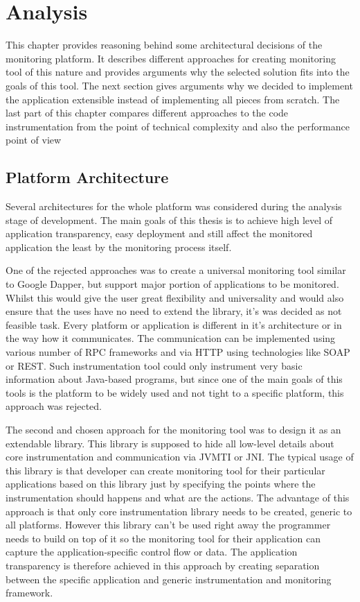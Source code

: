 \chapter{Analysis}
This chapter provides reasoning behind some architectural decisions of the monitoring platform. It describes different approaches for creating monitoring tool of this nature and provides arguments why the selected solution fits into the goals of this tool. The next section gives arguments why we decided to implement the application extensible instead of implementing all pieces from scratch. The last part of this chapter compares different approaches to the code instrumentation from the point of technical complexity and also the performance point of view

\section{Platform Architecture}
Several architectures for the whole platform was considered during the analysis stage of development. The main goals of this thesis is to achieve high level of application transparency, easy deployment and still affect the monitored application the least by the monitoring process itself.

One of the rejected approaches was to create a universal monitoring tool similar to Google Dapper, but support major portion of applications to be monitored. Whilst this would give the user great flexibility and universality and would also ensure that the uses have no need to extend the library, it's was decided as not feasible task. Every platform or application is different in it's architecture or in the way how it communicates. The communication can be implemented using various number of RPC frameworks and via HTTP using technologies like SOAP or REST.
Such instrumentation tool could only instrument very basic information about Java-based programs, but since one of the main goals of this tools is the platform to be widely used and not tight to a specific platform, this approach was rejected.

The second and chosen approach for the monitoring tool was to design it as an extendable library. This library is supposed to hide all low-level details about core instrumentation and communication via JVMTI or JNI. The typical usage of this library is that developer can create monitoring tool for their particular applications based on this library just by specifying the points where the instrumentation should happens and what are the actions. The advantage of this approach is that only core instrumentation library needs to be created, generic to all platforms. However this library can't be used right away the programmer needs to build on top of it  so the monitoring tool for their application can capture the application-specific control flow or data. The application transparency is therefore achieved in this approach by creating separation between the specific application and generic instrumentation and monitoring framework.

